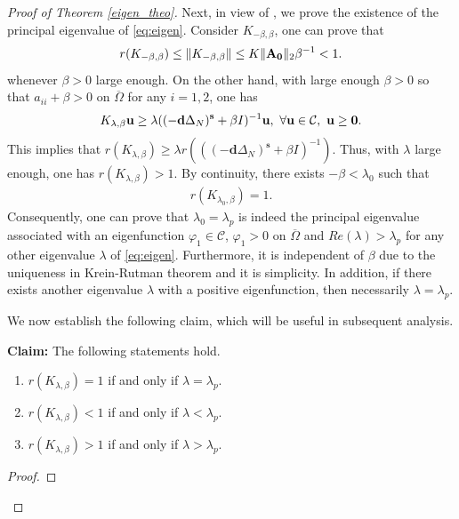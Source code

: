 \documentclass[a4paper,11pt]{amsart}
\theoremstyle{definition}
\def\O{\Omega}
\numberwithin{equation}{section}
\theoremstyle{definition}
\def\O{\Omega}
\begin{document}
\begin{proof}[Proof of Theorem \ref{eigen_theo}]
Next, in view of \cite[Lemma 3.2]{lam_ays_2016}, we  prove the existence of the principal eigenvalue of \eqref{eq:eigen}.
Consider $K_{-\beta,\beta}$, one can prove that
\begin{align*}
r(K_{-\beta,\beta})\leq \|K_{-\beta,\beta}\|\leq K\|{\bf A_0}\|_2\beta^{-1}<1.
\end{align*}
whenever $\beta>0$ large enough. On the other hand, with large enough $\beta>0$ so that $a_{ii}+\beta>0$ on $\overline{\O}$ for any $i=1,2$, one has
\begin{align*}
K_{\lambda,\beta}\textbf{u}\geq\lambda((-\textbf{d}\Delta_N)^{\textbf{s}}+\beta I)^{-1}\textbf{u},~\forall \textbf{u}\in \mathcal{C},~\textbf{u}\geq {\bf 0}.
\end{align*}
This implies that $r(K_{\lambda,\beta})\geq \lambda r(((-\textbf{d}\Delta_N)^{\textbf{s}}+\beta I)^{-1})$. Thus, with $\lambda$ large enough, one has $r(K_{\lambda,\beta})>1$. By continuity, there exists $-\beta<\lambda_0$ such that
\begin{align*}
r(K_{\lambda_0,\beta})=1.
\end{align*} 
Consequently, one can prove that $\lambda_0=\lambda_p$ is indeed the principal eigenvalue associated with an eigenfunction $\varphi_1 \in\mathcal{C}$, $\varphi_1>0$ on $\overline{\O}$ and $Re(\lambda)>\lambda_p$ for any other eigenvalue $\lambda$ of \eqref{eq:eigen}. Furthermore, it is independent of $\beta$ due to the uniqueness in Krein-Rutman theorem and it is simplicity. In addition, if there exists another eigenvalue $\lambda$ with a positive eigenfunction, then necessarily $\lambda = \lambda_p$. 

We now establish the following claim, which will be useful in subsequent analysis.
\phantom{1}



\textbf{Claim:}  The following statements hold.
\begin{enumerate}[label=(\roman*)]
\item\label{<1}  $r(K_{\lambda,\beta})=1$ if and only if $\lambda = \lambda_p$.
\item\label{>1}  $r(K_{\lambda,\beta})<1$ if and only if $\lambda < \lambda_p$.

\item\label{=1} $r(K_{\lambda,\beta})>1$ if and only if $\lambda > \lambda_p$.

\end{enumerate}

\begin{proof}



\end{proof}
\end{proof}
\end{document}
